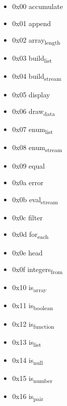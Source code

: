 \documentclass[11pt]{article}
\begin{document}
\begin{itemize}
\item 0x00 accumulate

\item 0x01 append

\item 0x02 array\textsubscript{length}

\item 0x03 build\textsubscript{list}

\item 0x04 build\textsubscript{stream}

\item 0x05 display

\item 0x06 draw\textsubscript{data}

\item 0x07 enum\textsubscript{list}

\item 0x08 enum\textsubscript{stream}

\item 0x09 equal

\item 0x0a error

\item 0x0b eval\textsubscript{stream}

\item 0x0c filter

\item 0x0d for\textsubscript{each}

\item 0x0e head

\item 0x0f integers\textsubscript{from}

\item 0x10 is\textsubscript{array}

\item 0x11 is\textsubscript{boolean}

\item 0x12 is\textsubscript{function}

\item 0x13 is\textsubscript{list}

\item 0x14 is\textsubscript{null}

\item 0x15 is\textsubscript{number}

\item 0x16 is\textsubscript{pair}


\end{itemize}
\end{document}
